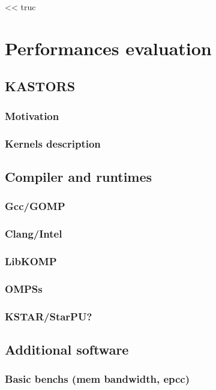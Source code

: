\begin{savequote}[6cm]
<< truc
\end{savequote}

\chapter{Performances evaluation}\label{chap:contrib:exp}
\chaptertoc

\section{KASTORS}

\subsection{Motivation}
\subsection{Kernels description}

\section{Compiler and runtimes}

\subsection{Gcc/GOMP}
\subsection{Clang/Intel}
\subsection{LibKOMP}
\subsection{OMPSs}
\subsection{KSTAR/StarPU?}

\section{Additional software}
\subsection{Basic benchs (mem bandwidth, epcc)}
